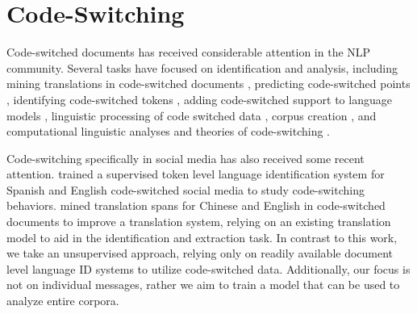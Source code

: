 \documentclass[11pt]{article}
\begin{document}


\section{Code-Switching}
Code-switched documents has received considerable attention in the NLP community.
Several tasks have focused on identification and analysis, including mining translations in code-switched documents 
\cite{wangling:acl2013}, predicting code-switched points \cite{solorio-liu:2008:EMNLP1},
identifying code-switched tokens  \cite{Lignos:13,yu-he-chien:2012:CLP2012,elfardy-diab:2012:POSTERS},
adding code-switched support to language models
\cite{li-fung:2012:PAPERS},
linguistic processing of code switched data
\cite{solorio-liu:2008:EMNLP2},  corpus creation
 \cite{LI12.964.L12-1573,diab-kamboj:2011:ALR9},
 and computational linguistic analyses and theories of code-switching \cite{sankofl:1998:ACLCOLING,joshi1982processing}.
 
Code-switching specifically in social media has also received some recent attention.
 trained a supervised token level language identification system for 
Spanish and English code-switched social media to study code-switching behaviors.
 mined translation spans for Chinese and English 
in code-switched documents to improve a translation system,
relying on an existing translation model to aid in the identification and extraction task.
In contrast to this work, we take an unsupervised approach, relying only on readily available document level
language ID systems to utilize code-switched data. Additionally, our focus is not on individual messages, rather
we aim to train a model that can be used to analyze entire corpora.
\end{document}
